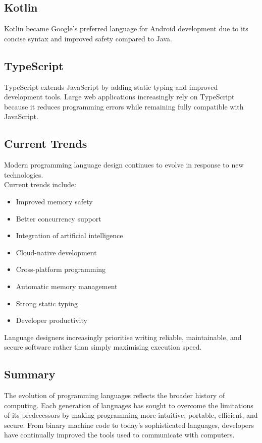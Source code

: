 \subsection{Kotlin}

Kotlin became Google's preferred language for Android development due to its concise syntax and improved safety compared to Java.

\subsection{TypeScript}

TypeScript extends JavaScript by adding static typing and improved development tools. Large web applications increasingly rely on TypeScript because it reduces programming errors while remaining fully compatible with JavaScript.

\subsection{Current Trends}

Modern programming language design continues to evolve in response to new technologies. \\

Current trends include:

\begin{itemize}
    \item Improved memory safety
    \item Better concurrency support
    \item Integration of artificial intelligence
    \item Cloud-native development
    \item Cross-platform programming
    \item Automatic memory management
    \item Strong static typing
    \item Developer productivity
\end{itemize}

Language designers increasingly prioritise writing reliable, maintainable, and secure software rather than simply maximising execution speed.

\subsection{Summary}

The evolution of programming languages reflects the broader history of computing. Each generation of languages has sought to overcome the limitations of its predecessors by making programming more intuitive, portable, efficient, and secure. From binary machine code to today's sophisticated languages, developers have continually improved the tools used to communicate with computers.\\

